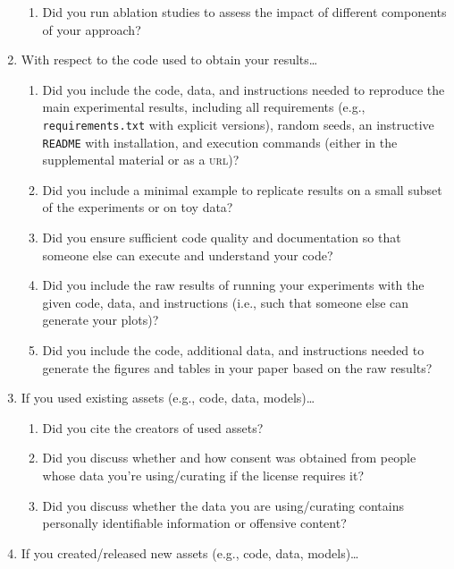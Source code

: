 \documentclass[11pt]{article}
\begin{document}
\begin{enumerate}
\begin{enumerate}
  \item Did you run ablation studies to assess the impact of different
    components of your approach?
    \answerTODO{}
  \end{enumerate}
\item With respect to the code used to obtain your results\dots
  \begin{enumerate}
\item Did you include the code, data, and instructions needed to reproduce the
    main experimental results, including all requirements (e.g.,
    \texttt{requirements.txt} with explicit versions), random seeds, an instructive
    \texttt{README} with installation, and execution commands (either in the
    supplemental material or as a \textsc{url})?
    \answerTODO{}
  \item Did you include a minimal example to replicate results on a small subset
    of the experiments or on toy data?
    \answerTODO{}
  \item Did you ensure sufficient code quality and documentation so that someone else
    can execute and understand your code?
    \answerTODO{}
  \item Did you include the raw results of running your experiments with the given
    code, data, and instructions (i.e., such that someone else can generate your plots)?
    \answerTODO{}
  \item Did you include the code, additional data, and instructions needed to generate
    the figures and tables in your paper based on the raw results?
    \answerTODO{}
  \end{enumerate}
\item If you used existing assets (e.g., code, data, models)\dots
  \begin{enumerate}
  \item Did you cite the creators of used assets?
    \answerTODO{}
  \item Did you discuss whether and how consent was obtained from people whose
    data you're using/curating if the license requires it?
    \answerTODO{}
  \item Did you discuss whether the data you are using/curating contains
    personally identifiable information or offensive content?
    \answerTODO{}
  \end{enumerate}
\item If you created/released new assets (e.g., code, data, models)\dots

\end{enumerate}
\end{document}
